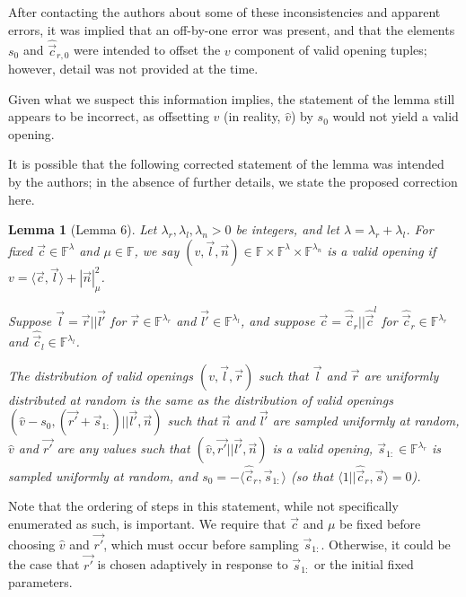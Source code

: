 \documentclass{article}
\newtheorem*{lemma}{Lemma}
\begin{document}
After contacting the authors about some of these inconsistencies and apparent errors, it was implied that an off-by-one error was present, and that the elements $s_0$ and $\hat{\vec{c}}_{r,0}$ were intended to offset the $v$ component of valid opening tuples; however, detail was not provided at the time.

Given what we suspect this information implies, the statement of the lemma still appears to be incorrect, as offsetting $v$ (in reality, $\hat{v}$) by $s_0$ would not yield a valid opening.

It is possible that the following corrected statement of the lemma was intended by the authors; in the absence of further details, we state the proposed correction here.

\begin{lemma}[Lemma 6]
	Let $\lambda_r, \lambda_l, \lambda_n > 0$ be integers, and let $\lambda = \lambda_r + \lambda_l$.
	For fixed $\vec{c} \in \mathbb{F}^\lambda$ and $\mu \in \mathbb{F}$, we say $(v, \vec{l}, \vec{n}) \in \mathbb{F} \times \mathbb{F}^\lambda \times \mathbb{F}^{\lambda_n}$ is a valid opening if $v = \langle \vec{c}, \vec{l} \rangle + |\vec{n}|_\mu^2$.

	Suppose $\vec{l} = \vec{r} || \vec{l'}$ for $\vec{r} \in \mathbb{F}^{\lambda_r}$ and $\vec{l'} \in \mathbb{F}^{\lambda_l}$, and suppose $\vec{c} = \hat{\vec{c}}_r || \hat{\vec{c}}^l$ for $\hat{\vec{c}}_r \in \mathbb{F}^{\lambda_r}$ and $\hat{\vec{c}}_l \in \mathbb{F}^{\lambda_l}$.

	The distribution of valid openings $(v, \vec{l}, \vec{r})$ such that $\vec{l}$ and $\vec{r}$ are uniformly distributed at random is the same as the distribution of valid openings $(\hat{v} - s_0, (\vec{r'} + \vec{s}_{1:}) || \vec{l'}, \vec{n})$ such that $\vec{n}$ and $\vec{l'}$ are sampled uniformly at random, $\hat{v}$ and $\vec{r'}$ are any values such that $(\hat{v}, \vec{r'} || \vec{l'}, \vec{n})$ is a valid opening, $\vec{s}_{1:} \in \mathbb{F}^{\lambda_r}$ is sampled uniformly at random, and $s_0 = -\langle \hat{\vec{c}}_r, \vec{s}_{1:} \rangle$ (so that $\langle 1 || \hat{\vec{c}}_r, \vec{s} \rangle = 0$).
\end{lemma}

Note that the ordering of steps in this statement, while not specifically enumerated as such, is important.
We require that $\vec{c}$ and $\mu$ be fixed before choosing $\hat{v}$ and $\vec{r'}$, which must occur before sampling $\vec{s}_{1:}$.
Otherwise, it could be the case that $\vec{r'}$ is chosen adaptively in response to $\vec{s}_{1:}$ or the initial fixed parameters.
\end{document}
